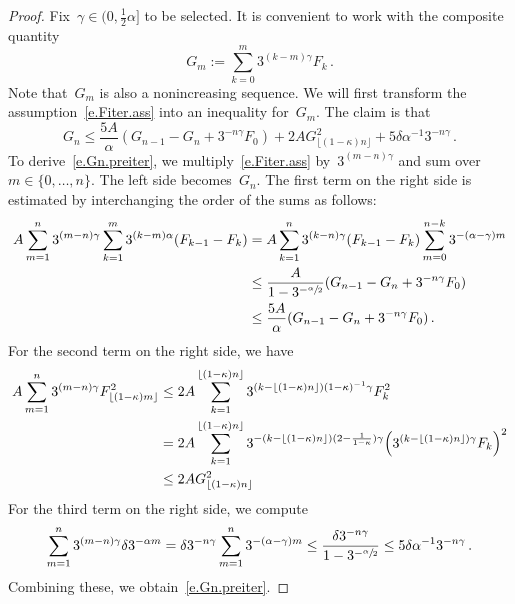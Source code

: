 \documentclass[11pt]{article} %
\numberwithin{equation}{section}
\theoremstyle{definition}
\begin{document}
\begin{proof} 
Fix~$\gamma \in (0,\frac12 \alpha]$ to be selected. It is convenient to work with the composite quantity 
\begin{equation*}
G_m := \sum_{k=0}^m 3^{(k-m)\gamma} F_k
\,.
\end{equation*}
Note that~$G_m$ is also a nonincreasing sequence. 
We will first transform the assumption~\eqref{e.Fiter.ass} into an inequality for~$G_m$. 
The claim is that 
\begin{equation}
\label{e.Gn.preiter}
G_n \leq 
\frac{5A}{\alpha} (G_{n-1} - G_{n} +  3^{-n\gamma} F_{0})
+
2A G_{\lfloor (1-\kappa) n \rfloor}^2 
+
5\delta \alpha^{-1} 3^{-n\gamma}\,.
\end{equation}
To derive~\eqref{e.Gn.preiter}, we multiply~\eqref{e.Fiter.ass} by~$3^{(m-n)\gamma}$ and sum over~$m \in\{ 0,\ldots,n\}$. The left side becomes~$G_n$. The first term on the right side is estimated by interchanging the order of the sums as follows:
\begin{align*} 
A \sum_{m=1}^n 3^{(m-n)\gamma} 
\sum_{k=1}^m 3^{(k-m)\alpha} (F_{k-1} - F_k) 
& =
A \sum_{k=1}^n 3^{(k-n)\gamma}  (F_{k-1} - F_k)   
\sum_{m=0}^{n-k} 3^{-(\alpha - \gamma)m}  
\\ & 
\leq 
\frac{A}{1-3^{-\sfrac \alpha2}} (G_{n-1} - G_{n} +  3^{-n\gamma} F_{0})
\\ & 
\leq 
\frac{5A}{\alpha} (G_{n-1} - G_{n} +  3^{-n\gamma} F_{0})
\,.
\end{align*}
For the second term on the right side, we have 
\begin{align*}
A \sum_{m=1}^n 
3^{(m-n)\gamma} F_{\lfloor (1-\kappa) m \rfloor}^2 
& \leq 
2A 
\sum_{k=1}^{\lfloor (1-\kappa) n \rfloor}
3^{( k -\lfloor (1-\kappa) n \rfloor )(1-\kappa)^{-1} \gamma} 
F_{k}^2 
\\ & 
= 
2A 
\sum_{k=1}^{\lfloor (1-\kappa) n \rfloor}
3^{- ( k -\lfloor (1-\kappa) n \rfloor ) ( 2 - \frac{1}{1-\kappa} ) \gamma}
\Bigl( 
3^{( k -\lfloor (1-\kappa) n \rfloor ) \gamma}
F_{k} \Bigr)^2 
\\ & 
\leq 
2A G_{\lfloor (1-\kappa) n \rfloor}^2
\end{align*}
For the third term on the right side, we compute
\begin{equation*}
\sum_{ m=1}^n 3^{ (m-n)\gamma} \delta 3^{-\alpha m} 
=
\delta 3^{-n\gamma} \sum_{ m=1}^n 3^{-(\alpha-\gamma)m} 
\leq 
\frac{\delta  3^{-n\gamma}}{1-3^{-\sfrac \alpha2}}
\leq 
5\delta \alpha^{-1}  3^{-n\gamma}  \,.
\end{equation*}
Combining these, we obtain~\eqref{e.Gn.preiter}.


\end{proof}
\end{document}
